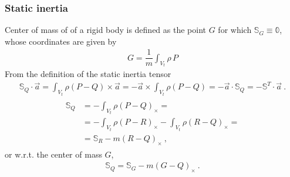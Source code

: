 \documentclass[letterpaper,10pt,english]{jupyterBook}
\begin{document}
\subsubsection{Static inertia}
\label{\detokenize{ch/inertia:static-inertia}}
\sphinxAtStartPar
{} Center of mass of of a rigid body is defined as the point \(G\) for which \(\mathbb{S}_G \equiv \mathbb{0}\), whose coordinates are given by
\begin{equation*}
\begin{split}G = \dfrac{1}{m} \int_{V_t} \rho \, P\end{split}
\end{equation*}
\sphinxAtStartPar
{} From the definition of the static inertia tensor
\begin{equation*}
\begin{split}\mathbb{S}_Q \cdot \vec{a} = \int_{V_t} \rho (P-Q) \times \vec{a} = - \vec{a} \times \int_{V_t} \rho (P-Q) = - \vec{a} \cdot \mathbb{S}_Q = - \mathbb{S}^T \cdot \vec{a} \ .\end{split}
\end{equation*}
\sphinxAtStartPar
{}
\begin{equation*}
\begin{split}\begin{aligned}
  \mathbb{S}_Q 
  & = - \int_{V_t} \rho (P - Q)_{\times} = \\
  & = - \int_{V_t} \rho (P - R)_{\times} - \int_{V_t} \rho (R - Q)_{\times} = \\
  & = \mathbb{S}_R - m (R-Q)_{\times} \ ,
\end{aligned}\end{split}
\end{equation*}
\sphinxAtStartPar
or w.r.t. the center of mass \(G\),
\begin{equation*}
\begin{split}\mathbb{S}_Q = \mathbb{S}_G - m (G-Q)_{\times} \ .\end{split}
\end{equation*}
\end{document}
